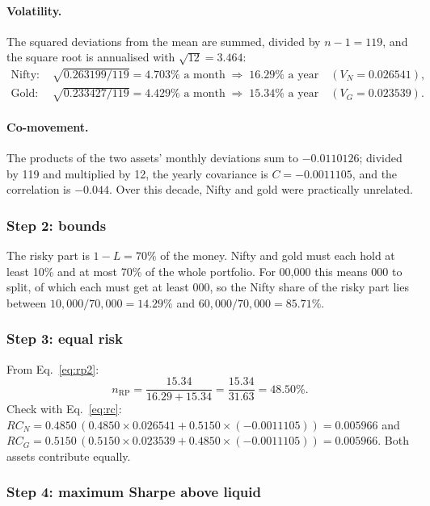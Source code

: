 \paragraph{Volatility.} The squared deviations from the mean are summed, divided by $n-1 = 119$, and
the square root is annualised with $\sqrt{12} = 3.464$:
\begin{align*}
  \text{Nifty: }& \sqrt{0.263199/119} = 4.703\% \text{ a month} \;\Rightarrow\; 16.29\% \text{ a year}
     \quad (V_N = 0.026541),\\
  \text{Gold: }& \sqrt{0.233427/119} = 4.429\% \text{ a month} \;\Rightarrow\; 15.34\% \text{ a year}
     \quad (V_G = 0.023539).
\end{align*}

\paragraph{Co-movement.} The products of the two assets' monthly deviations sum to $-0.0110126$;
divided by 119 and multiplied by 12, the yearly covariance is $C = -0.0011105$, and the correlation
is $-0.044$. Over this decade, Nifty and gold were practically unrelated.

\subsubsection{Step 2: bounds}

The risky part is $1 - L = 70\%$ of the money. Nifty and gold must each hold at least 10\% and at
most 70\% of the whole portfolio. For 00{,}000 this means 000 to split, of which each
must get at least 000, so the Nifty share of the risky part lies between
$10{,}000/70{,}000 = 14.29\%$ and $60{,}000/70{,}000 = 85.71\%$.

\subsubsection{Step 3: equal risk}

From Eq.~\eqref{eq:rp2}:
\[
  n_{\text{RP}} = \frac{15.34}{16.29 + 15.34} = \frac{15.34}{31.63} = 48.50\% .
\]
Check with Eq.~\eqref{eq:rc}:
$RC_N = 0.4850\,(0.4850 \times 0.026541 + 0.5150 \times (-0.0011105)) = 0.005966$ and
$RC_G = 0.5150\,(0.5150 \times 0.023539 + 0.4850 \times (-0.0011105)) = 0.005966$.
Both assets contribute equally.

\subsubsection{Step 4: maximum Sharpe above liquid}

